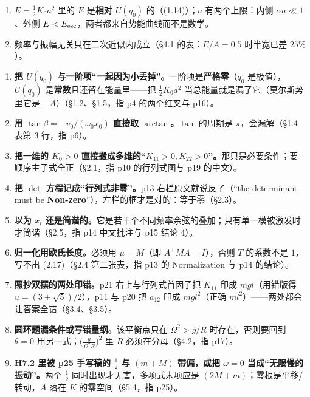 \documentclass[11pt]{ctexart}
\begin{document}
\begin{enumerate}
\item $E=\frac12K_0a^2$ 里的 $E$ 是\textbf{相对 $U(q_0)$} 的（(1.14)）；$a$ 有两个上限：内侧 $\alpha a\ll1$、外侧 $E<E_{\rm esc}$，两者都来自势能曲线而不是数学。
\item 频率与振幅无关只在二次近似内成立（§4.1 的表：$E/A=0.5$ 时半宽已差 $25\%$）。
\end{enumerate}


{\small
\begin{enumerate}
\item \textbf{把 $U(q_0)$ 与一阶项“一起因为小丢掉”。}一阶项是\textbf{严格零}（$q_0$ 是极值），$U(q_0)$ 是\textbf{常数}且还留在能量里——把 $\frac12K_0a^2$ 当总能量就是漏了它（莫尔斯势里它是 $-A$）（§1.2、§1.5，指 p4 的两个红叉与 p16）。
\item \textbf{用 $\tan\beta=-v_0/(\omega_0x_0)$ 直接取 $\arctan$。}$\tan$ 的周期是 $\pi$，会漏解（§1.4 表第 3 行，指 p6）。
\item \textbf{把一维的 $K_0>0$ 直接搬成多维的“$K_{11}>0,K_{22}>0$”。}那只是必要条件；要顺序主子式全正（§2.1，指 p10 的行列式图与 p19 的中文）。
\item \textbf{把 $\det$ 方程记成“行列式非零”。}p13 右栏原文就说反了（“the determinant must be \textbf{Non-zero}”），左栏的框才是对的：等于零（§2.3）。
\item \textbf{以为 $x_i$ 还是简谐的。}它是若干个不同频率余弦的叠加；只有单一模被激发时才简谐（§2.5，指 p14 中文批注与 p15 结论 4）。
\item \textbf{归一化用欧氏长度。}必须用 $\mu=M$（即 $A^{\!\top}MA=I$），否则 $T$ 的系数不是 $1$，写不出 (2.17)（§2.4 第二张表，指 p13 的 Normalization 与 p14 的结论）。
\item \textbf{照抄双摆的两处印错。}p21 右上与行列式首因子把 $K_{11}$ 印成 $mgl$（用错版得 $u=(3\pm\sqrt5)/2$），p11 与 p20 把 $a_{12}$ 印成 $mgl^2$（正确 $ml^2$）——两处都会让答案全错（§3.4、§3.5）。
\item \textbf{圆环题漏条件或写错量纲。}该平衡点只在 $\Omega^2>g/R$ 时存在，否则要回到 $\theta=0$ 用另一式；$\bigl(\frac{g}{\Omega^2R}\bigr)^2$ 里 $R$ 必须在分母（§4.2，指 p17）。
\item \textbf{H7.2 里被 p25 手写稿的 $\frac12$ 与 $(m+M)$ 带偏，或把 $\omega=0$ 当成“无限慢的振动”。}两个 $\frac12$ 同时出现才无害，多项式末项应是 $(2M+m)$；零根是平移/转动，$A$ 落在 $K$ 的零空间（§5.4，指 p25）。
\end{enumerate}
}
\end{document}

